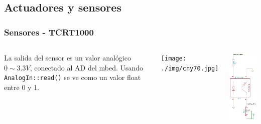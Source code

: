\documentclass[compress]{beamer}
\begin{document}
\subsection{Actuadores y sensores}
\begin{frame}[fragile]
 \frametitle{Sensores - TCRT1000}
\begin{columns}
La salida del sensor es un valor analógico $0 \sim 3.3V$, conectado al AD del mbed. Usando \verb|AnalogIn::read()| se ve 
como un valor float entre 0 y 1.
\begin{center}
 \texttt{[image: ./img/cny70.jpg]}
\end{center}
\begin{center}
 \includegraphics[width=0.8\columnwidth]{./img/sensor.pdf}

\end{center}
\end{columns}
\end{frame}
\end{document}
